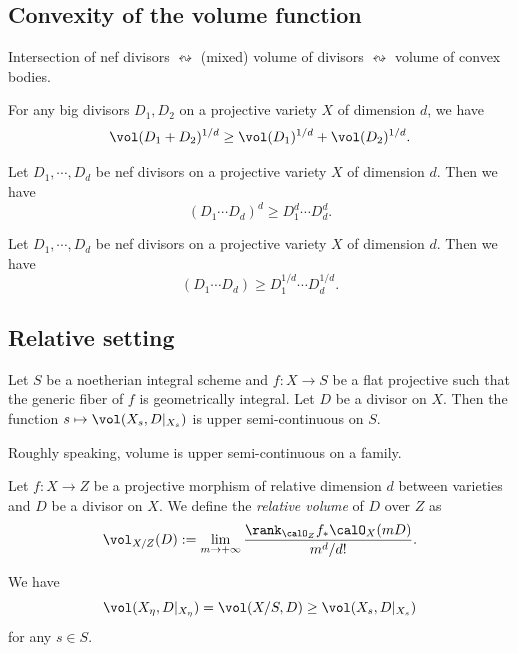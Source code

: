\subsection{Convexity of the volume function}

  \begin{slogan}
    Intersection of nef divisors $\leftrightsquigarrow$ (mixed) volume of divisors $\leftrightsquigarrow$ volume of convex bodies.
  \end{slogan}

    \begin{theorem}
      For any big divisors $D_1, D_2$ on a projective variety $X$ of dimension $d$, we have
      \[ \vol(D_1 + D_2)^{1/d} \geq \vol(D_1)^{1/d} + \vol(D_2)^{1/d}. \]
    \end{theorem}

    \begin{corollary}
      Let $D_1,\cdots,D_d$ be nef divisors on a projective variety $X$ of dimension $d$.
      Then we have
      \[ (D_1 \cdots D_d)^d \geq D_1^d \cdots D_d^d. \]
     \Yang{}
    \end{corollary}

    \begin{corollary}
      Let $D_1,\cdots,D_d$ be nef divisors on a projective variety $X$ of dimension $d$.
      Then we have
      \[ (D_1 \cdots D_d) \geq D_1^{1/d} \cdots D_d^{1/d}. \]
     \Yang{}
    \end{corollary}


\subsection{Relative setting}


  \begin{theorem}
    Let $S$ be a noetherian integral scheme and $f: X \to S$ be a flat projective such that the generic fiber of $f$ is geometrically integral.
    Let $D$ be a divisor on $X$.
    Then the function $s \mapsto \vol(X_s, D|_{X_s})$ is upper semi-continuous on $S$.
     \Yang{}
  \end{theorem}
  Roughly speaking, volume is upper semi-continuous on a family.


  \begin{definition}
    Let $f: X \to Z$ be a projective morphism of relative dimension $d$ between varieties and $D$ be a divisor on $X$.
    We define the \emph{relative volume} of $D$ over $Z$ as
    \[ \vol_{X/Z}(D) := \lim_{m \to +\infty} \frac{\rank_{\calO_Z} f_* \calO_X(mD)}{m^d/d!}. \]
     \Yang{}
  \end{definition}


  \begin{corollary}
    We have 
    \[ \vol(X_\eta, D|_{X_\eta}) = \vol(X/S,D) \geq \vol(X_s, D|_{X_s}) \]
    for any $s \in S$.
     \Yang{}
  \end{corollary}




